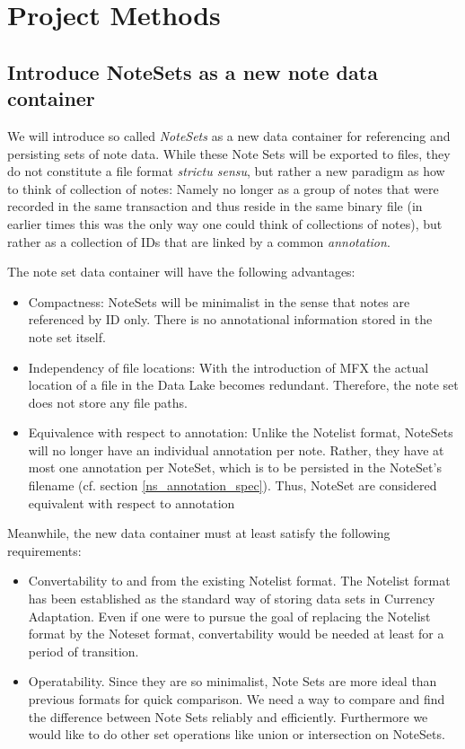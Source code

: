 \chapter{ Project Methods}
\label{chap:projectsteps}


\section{Introduce NoteSets as a new note data container}
\label{noteset_goal}
We will introduce so called \emph{NoteSets} as a new data container for referencing and persisting sets of note data. While these Note Sets will be exported to files, they do not constitute a file format \emph{strictu sensu}, but rather a new paradigm as how to think of collection of notes: Namely no longer as a group of notes that were recorded in the same transaction and thus reside in the same binary file (in earlier times this was the only way one could think of collections of notes), but rather as a collection of IDs that are linked by a common \emph{annotation}.

The note set data container will have the following advantages:
\begin{itemize}
\item Compactness: NoteSets will be minimalist in the sense that notes are referenced by ID only. There is no annotational information stored in the note set itself.
\item Independency of file locations: With the introduction of MFX the actual location of a file in the Data Lake becomes redundant. Therefore, the note set does not store any file paths.
\item Equivalence with respect to annotation: Unlike the Notelist format, NoteSets will no longer have an individual annotation per note. Rather, they have at most one annotation per NoteSet, which is to be persisted in the NoteSet's filename (cf. section \ref{ns_annotation_spec}). Thus, NoteSet are considered equivalent with respect to annotation
\end{itemize}
Meanwhile, the new data container must at least satisfy the following requirements:
\begin{itemize}
\item Convertability to and from the existing Notelist format. The Notelist format has been established as the standard way of storing data sets in Currency Adaptation. Even if one were to pursue the goal of replacing the Notelist format by the Noteset format, convertability would be needed at least for a period of transition.
 \item Operatability. Since they are so minimalist, Note Sets are more ideal than previous formats for quick comparison. We need a way to compare and find the difference between Note Sets reliably and efficiently. Furthermore we would like to do other set operations like union or intersection on NoteSets.
\end{itemize}

